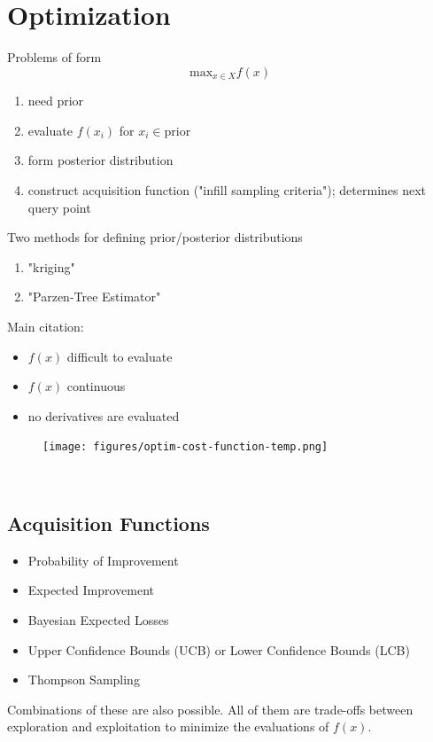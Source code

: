 \documentclass{article}
\newcommand{\todo}[1]{\colorbox{WildStrawberry}{\textcolor{white}{#1}}}
\begin{document}
\section{Optimization}
\label{section:optimization}

Problems of form
\begin{equation}
    \text{max}_{x\in X} f(x)
\end{equation}

\begin{enumerate}
    \item need prior
    \item evaluate $f(x_i)$ for $x_i\in\text{prior}$
    \item form posterior distribution 
    \item construct acquisition function ("infill sampling criteria"); determines next query point
\end{enumerate}

Two methods for defining prior/posterior distributions
\begin{enumerate}
    \item "kriging"
    \item "Parzen-Tree Estimator"
\end{enumerate}

Main citation: \cite{Jones1998}
\begin{itemize}
    \item $f(x)$ difficult to evaluate
    \item $f(x)$ continuous
    \item no derivatives are evaluated
\end{itemize}

\begin{figure}[H]
    \centering
    \texttt{[image: figures/optim-cost-function-temp.png]}
    \caption{\todo{caption}}
    \label{fig:optim-comparison-cost-function}
\end{figure}

\subsection{Acquisition Functions}
\begin{itemize}
    \item Probability of Improvement
    \item Expected Improvement
    \item Bayesian Expected Losses
    \item Upper Confidence Bounds (UCB) or Lower Confidence Bounds (LCB)
    \item Thompson Sampling
\end{itemize}
Combinations of these are also possible.
All of them are trade-offs between exploration and exploitation to minimize the evaluations of
$f(x)$.
\end{document}
